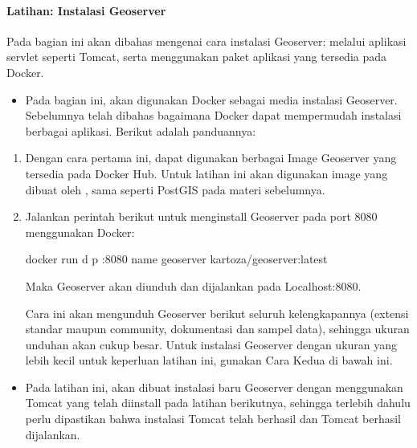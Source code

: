 \documentclass[letterpaper,10pt,english]{sphinxmanual}
\begin{document}
\paragraph{Latihan: Instalasi Geoserver}
\label{\detokenize{sesi3/interoperabilitas:latihan-instalasi-geoserver}}
Pada bagian ini akan dibahas mengenai cara instalasi Geoserver: melalui aplikasi servlet seperti Tomcat, serta menggunakan paket aplikasi yang tersedia pada Docker.
\begin{itemize}
\item {} 
Pada bagian ini, akan digunakan Docker sebagai media instalasi Geoserver. Sebelumnya telah dibahas bagaimana Docker dapat mempermudah instalasi berbagai aplikasi. Berikut adalah panduannya:

\end{itemize}
\begin{enumerate}
%
\item {} 
Dengan cara pertama ini, dapat digunakan berbagai Image Geoserver yang tersedia pada Docker Hub. Untuk latihan ini akan digunakan image yang dibuat oleh , sama seperti PostGIS pada materi sebelumnya.

\item {} 
Jalankan perintah berikut untuk menginstall Geoserver pada port 8080 menggunakan Docker:

\begin{sphinxVerbatim}[commandchars=\\\{\}]
docker run \PYGZhy{}d \PYGZhy{}p :8080 \PYGZhy{}\PYGZhy{}name geoserver kartoza/geoserver:latest 
\end{sphinxVerbatim}

Maka Geoserver akan diunduh dan dijalankan pada Localhost:8080.

Cara ini akan mengunduh Geoserver berikut seluruh kelengkapannya (extensi standar maupun community, dokumentasi dan sampel data), sehingga ukuran unduhan akan cukup besar. Untuk instalasi Geoserver dengan ukuran yang lebih kecil untuk keperluan latihan ini, gunakan Cara Kedua di bawah ini.

\end{enumerate}
\begin{itemize}
\item {} 
Pada latihan ini, akan dibuat instalasi baru Geoserver dengan menggunakan Tomcat yang telah diinstall pada latihan berikutnya, sehingga terlebih dahulu perlu dipastikan bahwa instalasi Tomcat telah berhasil dan Tomcat berhasil dijalankan.

\end{itemize}
\end{document}
